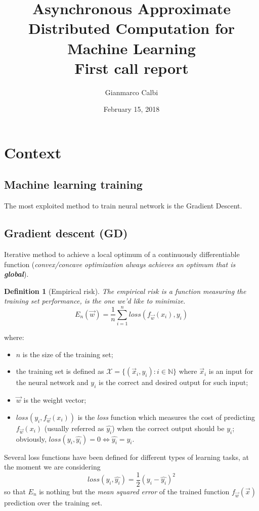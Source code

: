 \documentclass[a4paper,12pt]{article}
\title{%
  Asynchronous Approximate Distributed Computation for Machine Learning  \\
  First call report}
\author{Gianmarco Calbi}
\date{February 15, 2018}
\theoremstyle{newplanestyle}
\theoremstyle{newdefinitionstyle}
\newtheorem*{newdef*}{Definition}
\theoremstyle{newprovestyle}
\begin{document}
\maketitle

\section*{Context}
\subsection*{Machine learning training}
The most exploited method to train neural network is the Gradient Descent.

\subsection*{Gradient descent (GD)}
Iterative method to achieve a local optimum of a continuously differentiable function (\textit{convex/concave optimization always achieves an optimum that is \textbf{global}}).

\begin{newdef*}[Empirical risk]
The \textit{empirical risk} is a function measuring the training set performance, is the one we'd like to minimize.
\[
E_n(\vec{w})=\frac{1}{n}\sum_{i=1}^{n}loss(f_{\vec{w}}(x_i),y_i)
\]
\end{newdef*}
where:
\begin{itemize}
\item $n$ is the size of the training set;
\item the training set is defined as $\mathcal{X} = \{(\vec{x}_i, y_i) : i \in \mathbb{N}\}$ where $\vec{x}_i$ is an input for the neural network and $y_i$ is the correct and desired output for such input;
\item $\vec{w}$ is the weight vector;
\item $loss(y_i, f_{\vec{w}}(x_i))$ is the \textit{loss} function which measures the cost of predicting $f_{\vec{w}}(x_i)$ (usually referred as $\hat{y_i}$) when the correct output should be $y_i$; obviously, $loss(y_i, \hat{y_i})=0 \Leftrightarrow \hat{y_i} = y_i$.
\end{itemize}

Several loss functions have been defined for different types of learning tasks, at the moment we are considering
\[
loss(y_i, \hat{y_i}) = \frac{1}{2}(y_i - \hat{y_i})^2
\]
so that $E_n$ is nothing but the \textit{mean squared error} of the trained function $f_{\vec{w}}(\vec{x})$ prediction over the training set.
\end{document}
